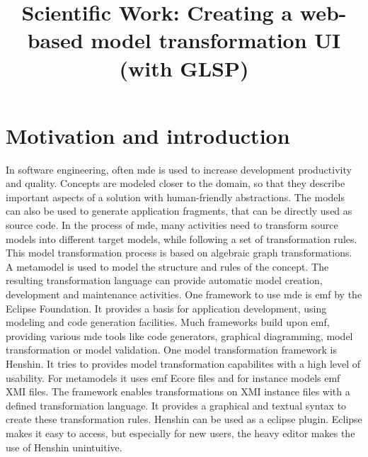 \documentclass[conference,onecolumn]{IEEEtran}
\begin{document}
  \title{Scientific Work: Creating a web-based model transformation UI (with GLSP)}

  \author{
    }

  \maketitle

  \IEEEpeerreviewmaketitle

  \newpage

  \section{Motivation and introduction}
  \label{sec:motivation}

  In software engineering, often \ac{mde} is used to increase development productivity and quality. Concepts are modeled closer to the domain, so that they describe important aspects of a solution with human-friendly abstractions. The models can also be used to generate application fragments, that can be directly used as source code. In the process of \ac{mde}, many activities need to transform source models into different target models, while following a set of transformation rules. This model transformation process is based on algebraic graph transformations. A metamodel is used to model the structure and rules of the concept. The resulting transformation language can provide automatic model creation, development and maintenance activities. \cite{transformations-modeldriven} One framework to use \ac{mde} is \ac{emf} by the Eclipse Foundation. It provides a basis for application development, using modeling and code generation facilities. Much frameworks build upon \ac{emf}, providing various \ac{mde} tools like code generators, graphical diagramming, model transformation or model validation. \cite{emf} One model transformation framework is Henshin. \cite{henshin-repo} It tries to provides model transformation capabilites with a high level of usability. \cite{henshin-usability} For metamodels it uses \ac{emf} Ecore files and for instance models \ac{emf} XMI files. The framework enables transformations on XMI instance files with a defined transformation language. It provides a graphical and textual syntax to create these transformation rules. \cite{henshin-repo} Henshin can be used as a eclipse plugin. Eclipse makes it easy to access, but especially for new users, the heavy editor makes the use of Henshin unintuitive.
\end{document}
